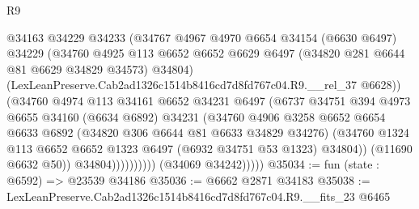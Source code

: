\begin{lexlean}{R9}
\begin{coremodule}
                              @34163
                              @34229
                              @34233
                              (@34767
                                @4967
                                @4970
                                @6654
                                @34154
                                (@6630 @6497)
                                @34229
                                (@34760
                                  @4925
                                  @113
                                  @6652
                                  @6652
                                  @6629
                                  @6497
                                  (@34820 @281 @6644 @81 @6629 @34829 @34573)
                                  @34804)
                                (LexLeanPreserve.Cab2ad1326c1514b8416cd7d8fd767c04.R9.__rel_37
                                  @6628))
                              (@34760
                                @4974
                                @113
                                @34161
                                @6652
                                @34231
                                @6497
                                (@6737
                                  @34751
                                  @394
                                  @4973
                                  @6655
                                  @34160
                                  (@6634 @6892)
                                  @34231
                                  (@34760
                                    @4906
                                    @3258
                                    @6652
                                    @6654
                                    @6633
                                    @6892
                                    (@34820 @306 @6644 @81 @6633 @34829 @34276)
                                    (@34760
                                      @1324
                                      @113
                                      @6652
                                      @6652
                                      @1323
                                      @6497
                                      (@6932 @34751 @53 @1323)
                                      @34804))
                                  (@11690 @6632 @50))
                                @34804))))))))))
            (@34069 @34242)))))
@35034 := fun (state : @6592) => @23539 @34186
@35036 := @6662 @2871 @34183
@35038 := LexLeanPreserve.Cab2ad1326c1514b8416cd7d8fd767c04.R9.__fits_23 @6465

\end{coremodule}
\end{lexlean}

